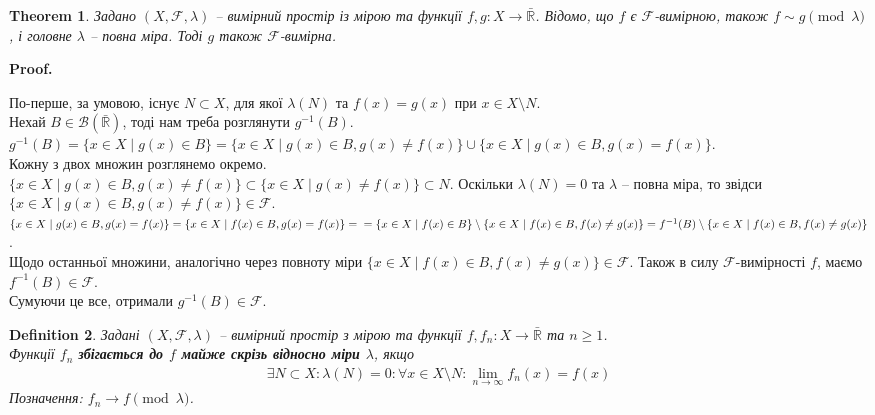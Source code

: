 \documentclass[a4paper, 10pt]{article}
\makeatletter
\theoremstyle{theoremdd}
\newtheorem{theorem}{Theorem}[subsection]
\newtheorem{definition}[theorem]{Definition}
\renewenvironment{proof}[1][Proof.\\]{\par
\pushQED{\hfill \qed}%
\normalfont \topsep6\p@\@plus6\p@\relax
\trivlist
\item\relax
{\bfseries
#1\@addpunct{.}}\hspace\labelsep\ignorespaces
}{%
\popQED\endtrivlist\@endpefalse
}
\makeatother
\begin{document}
\begin{theorem}
Задано $(X,\mathcal{F},\lambda)$ -- вимірний простір із мірою та функції $f,g \colon X \to \bar{\mathbb{R}}$. Відомо, що $f$ є $\mathcal{F}$-вимірною, також $f \sim g \pmod \lambda$, і головне $\lambda$ -- повна міра. Тоді $g$ також $\mathcal{F}$-вимірна.
\end{theorem}

\begin{proof}
По-перше, за умовою, існує $N \subset X$, для якої $\lambda(N)$ та $f(x) = g(x)$ при $x \in X \setminus N$.\\
Нехай $B \in \mathcal{B}(\bar{\mathbb{R}})$, тоді нам треба розглянути $g^{-1}(B)$.\\
$g^{-1}(B) = \{x \in X \mid g(x) \in B\} = \{x \in X \mid g(x) \in B, g(x) \neq f(x)\} \cup \{x \in X \mid g(x) \in B, g(x) = f(x)\}$.\\
Кожну з двох множин розглянемо окремо.\\
$\{x \in X \mid g(x) \in B, g(x) \neq f(x)\} \subset \{x \in X \mid g(x) \neq f(x)\} \subset N$. Оскільки $\lambda(N) = 0$ та $\lambda$ -- повна міра, то звідси $\{x \in X \mid g(x) \in B, g(x) \neq f(x)\} \in \mathcal{F}$.\\
$\{x \in X \mid g(x) \in B, g(x) = f(x)\} = \{x \in X \mid f(x) \in B, g(x) = f(x)\} = \\ =\{x \in X \mid f(x) \in B\} \setminus \{x \in X \mid f(x) \in B, f(x) \neq g(x)\} = f^{-1}(B) \setminus \{x \in X \mid f(x) \in B, f(x) \neq g(x)\}$.\\
Щодо останньої множини, аналогічно через повноту міри $\{x \in X \mid f(x) \in B, f(x) \neq g(x)\} \in \mathcal{F}$. Також в силу $\mathcal{F}$-вимірності $f$, маємо $f^{-1}(B) \in \mathcal{F}$.\\
Сумуючи це все, отримали $g^{-1}(B) \in \mathcal{F}$.
\end{proof}

\begin{definition}
Задані $(X,\mathcal{F},\lambda)$ -- вимірний простір з мірою та функції $f,f_n \colon X \to \bar{\mathbb{R}}$ та $n \geq 1$.\\
Функції $f_n$ \textbf{збігається до $f$ майже скрізь відносно міри $\lambda$}, якщо
\begin{align*}
\exists N \subset X: \lambda(N) = 0: \forall x \in X \setminus N: \lim_{n \to \infty} f_n(x) =f(x)
\end{align*}
Позначення: $f_n \to f \pmod{\lambda}$.
\end{definition}
\end{document}
